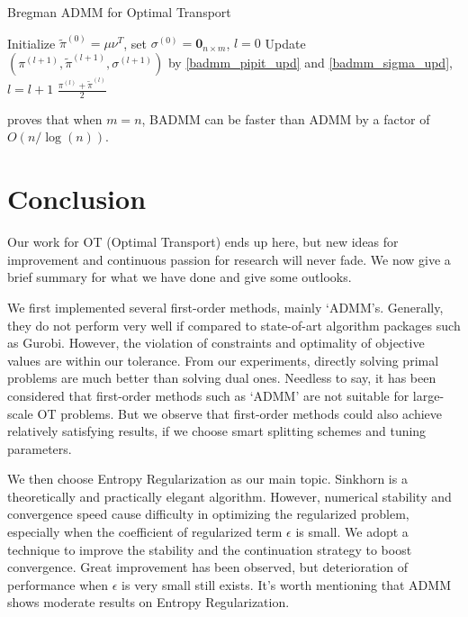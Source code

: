\documentclass[english]{pkupaper}
\begin{document}
\begin{algorithm}
\caption{Bregman ADMM for Optimal Transport}
\label{alg:BADMM}
\begin{algorithmic}[1]
\STATE Initialize $\tilde\pi^{(0)}=\mu\nu^T$, set $\sigma^{(0)}=\mathbf{0}_{n\times m}$, $l=0$
	\STATE Update $(\pi^{(l+1)},\tilde\pi^{(l+1)},\sigma^{(l+1)})$ by \ref{badmm_pipit_upd} and \ref{badmm_sigma_upd}, $l=l+1$
\ENDWHILE
\RETURN $\frac{\pi^{(l)}+\tilde\pi^{(l)}}{2}$
\end{algorithmic}
\end{algorithm}

\cite{BADMM} proves that when $m=n$, BADMM can be faster than ADMM by a factor of $O(n/ \log(n))$. 





\section{Conclusion}
\label{sec:5}
Our work for OT (Optimal Transport) ends up here, but new ideas for improvement and continuous passion for research will never fade. We now give a brief summary for what we have done and give some outlooks.

We first implemented several first-order methods, mainly `ADMM's. Generally, they do not perform very well if compared to state-of-art algorithm packages such as Gurobi. However, the violation of constraints and optimality of objective values are within our tolerance. From our experiments, directly solving primal problems are much better than solving dual ones. Needless to say, it has been considered that first-order methods such as `ADMM' are not suitable for large-scale OT problems. But we observe that first-order methods could also achieve relatively satisfying results, if we choose smart splitting schemes and tuning parameters.

We then choose Entropy Regularization as our main topic. Sinkhorn is a theoretically and practically elegant algorithm. However, numerical stability and convergence speed cause difficulty in optimizing the regularized problem, especially when the coefficient of regularized term $\epsilon$ is small. We adopt a technique to improve the stability and the continuation strategy to boost convergence. Great improvement has been observed, but deterioration of performance when $\epsilon$ is very small still exists. It's worth mentioning that ADMM shows moderate results on Entropy Regularization.
\end{document}
